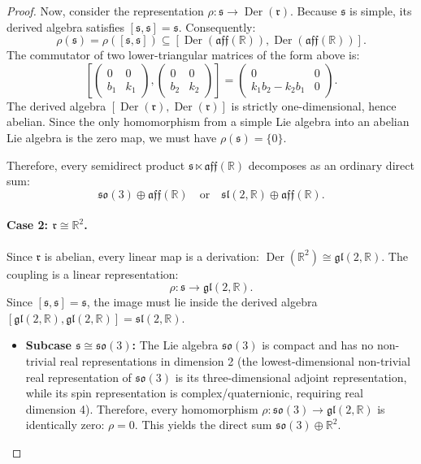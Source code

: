 \documentclass[11pt,a4paper]{article}
\theoremstyle{definition}
\theoremstyle{remark}
\newcommand{\R}{\mathbb{R}}
\newcommand{\s}{\mathfrak{s}}
\newcommand{\rr}{\mathfrak{r}}
\newcommand{\Der}{\operatorname{Der}}
\begin{document}
\begin{proof}
Now, consider the representation $\rho \colon \s \to \Der(\rr)$. Because $\s$ is simple, its derived algebra satisfies $[\s, \s] = \s$. Consequently:
\begin{equation}
    \rho(\s) = \rho([\s, \s]) \subseteq [\Der(\mathfrak{aff}(\R)), \Der(\mathfrak{aff}(\R))].
\end{equation}
The commutator of two lower-triangular matrices of the form above is:
\begin{equation}
    \left[ \begin{pmatrix} 0 & 0 \\ b_1 & k_1 \end{pmatrix}, \begin{pmatrix} 0 & 0 \\ b_2 & k_2 \end{pmatrix} \right] = \begin{pmatrix} 0 & 0 \\ k_1 b_2 - k_2 b_1 & 0 \end{pmatrix}.
\end{equation}
The derived algebra $[\Der(\rr), \Der(\rr)]$ is strictly one-dimensional, hence abelian. Since the only homomorphism from a simple Lie algebra into an abelian Lie algebra is the zero map, we must have $\rho(\s) = \{0\}$. 

Therefore, every semidirect product $\s \ltimes \mathfrak{aff}(\R)$ decomposes as an ordinary direct sum:
\begin{equation}
    \mathfrak{so}(3) \oplus \mathfrak{aff}(\R) \quad \text{or} \quad \mathfrak{sl}(2,\R) \oplus \mathfrak{aff}(\R).
\end{equation}

\paragraph{Case 2: $\rr \cong \R^2$.}
Since $\rr$ is abelian, every linear map is a derivation: $\Der(\R^2) \cong \mathfrak{gl}(2,\R)$. The coupling is a linear representation:
\begin{equation}
    \rho \colon \s \to \mathfrak{gl}(2,\R).
\end{equation}
Since $[\s, \s] = \s$, the image must lie inside the derived algebra $[\mathfrak{gl}(2,\R), \mathfrak{gl}(2,\R)] = \mathfrak{sl}(2,\R)$.
\begin{itemize}
    \item \textbf{Subcase $\s \cong \mathfrak{so}(3)$:} The Lie algebra $\mathfrak{so}(3)$ is compact and has no non-trivial real representations in dimension 2 (the lowest-dimensional non-trivial real representation of $\mathfrak{so}(3)$ is its three-dimensional adjoint representation, while its spin representation is complex/quaternionic, requiring real dimension 4). Therefore, every homomorphism $\rho \colon \mathfrak{so}(3) \to \mathfrak{gl}(2,\R)$ is identically zero: $\rho = 0$. This yields the direct sum $\mathfrak{so}(3) \oplus \R^2$.
    

\end{itemize}
\end{proof}
\end{document}
